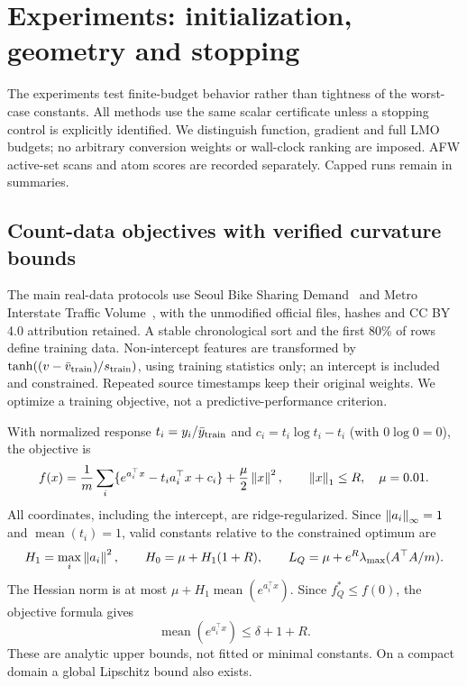 \section{Experiments: initialization, geometry and stopping}
\label{sec:experiments}
The experiments test finite-budget behavior rather than tightness of the
worst-case constants. All methods use the same scalar certificate unless
a stopping control is explicitly identified. We distinguish function,
gradient and full LMO budgets; no arbitrary conversion weights or
wall-clock ranking are imposed. AFW active-set scans and atom scores
are recorded separately. Capped runs remain in summaries.

\subsection{Count-data objectives with verified curvature bounds}
The main real-data protocols use Seoul Bike Sharing Demand~\cite{seoul}
and Metro Interstate Traffic Volume~\cite{metro}, with the unmodified
official files, hashes and CC BY 4.0 attribution retained. A stable
chronological sort and the first 80\% of rows define training data.
Non-intercept features are transformed by
$\tanh((v-\bar v_{\rm train})/s_{\rm train})$, using training statistics
only; an intercept is included and constrained. Repeated source
timestamps keep their original weights. We optimize a training
objective, not a predictive-performance criterion.

With normalized response $t_i=y_i/\bar y_{\rm train}$ and
$c_i=t_i\log t_i-t_i$ (with $0\log0=0$), the objective is
\begin{equation}\label{eq:poisson}
 f(x)=\frac1m\sum_i\{e^{a_i^\top x}-t_i a_i^\top x+c_i\}
          +\frac{\mu}{2}\left\|x\right\|^2,\qquad \left\|x\right\|_1\le R,
 \quad\mu=0.01.
\end{equation}
All coordinates, including the intercept, are ridge-regularized.
Since $\left\|a_i\right\|_\infty=1$ and $\operatorname{mean}(t_i)=1$, valid
constants relative to the constrained optimum are
\begin{equation}\label{eq:poissonconstants}
 H_1=\max_i\left\|a_i\right\|^2,\qquad H_0=\mu+H_1(1+R),\qquad
 L_Q=\mu+e^R\lambda_{\max}(A^\top A/m).
\end{equation}
The Hessian norm is at most $\mu+H_1\operatorname{mean}(e^{a_i^\top x})$.
Since $f_Q^*\le f(0)$, the objective formula gives
\[
 \operatorname{mean}(e^{a_i^\top x})\le\delta+1+R.
\]
These are analytic upper bounds, not fitted or minimal constants.
On a compact domain a global Lipschitz bound also exists.

